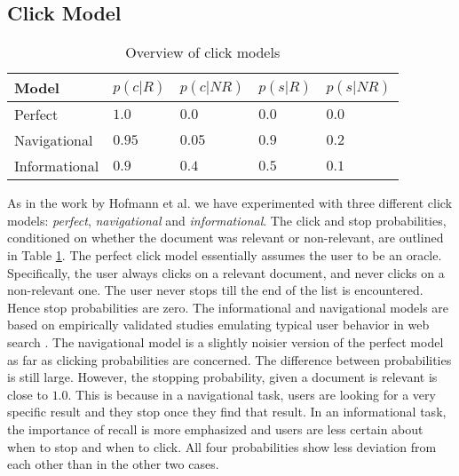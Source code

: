 \documentclass{acm_proc_article-sp}
\begin{document}
\subsection{Click Model}
\begin{table}
\caption{Overview of click models}
    \begin{tabular}[t]{ |p{2.0cm} | p{1.3cm} | p{1.3cm} | p{1.3cm} | p{1.3cm} |}
    \hline
    Model & $p(c|R)$ & $p(c|NR)$ & $p(s|R)$ & $p(s|NR)$ \\ \hline
    Perfect & $1.0$ & $0.0$ & $0.0$ & $0.0$  \\ \hline
Navigational & $0.95$ & $0.05$ & $0.9$ & $0.2$   \\ \hline
Informational & $0.9$ & $0.4$ & $0.5$ & $0.1$    \\ \hline
    \end{tabular}
\label{click}
\end{table}
As in the work by Hofmann et al. \cite{hofmann} we have experimented with three different click models: \emph{perfect}, \emph{navigational} and \emph{informational}. The click and stop probabilities, conditioned on whether the document was relevant or non-relevant, are outlined in Table \ref{click}. The perfect click model essentially assumes the user to be an oracle. Specifically, the user always clicks on a relevant document, and never clicks on a non-relevant one. The user never stops till the end of the list is encountered. Hence stop probabilities are zero. The informational and navigational models are based on empirically validated studies emulating typical user behavior in web search \cite{broder, guo1, guo2}. The navigational model is a slightly noisier version of the perfect model as far as clicking probabilities are concerned. The difference between probabilities is still large. However, the stopping probability, given a document is relevant is close to $1.0$. This is because in a navigational task, users are looking for a very specific result and they stop once they find that result. In an informational task, the importance of recall is more emphasized and users are less certain about when to stop and when to click. All four probabilities show less deviation from each other than in the other two cases.\\ \\
\end{document}
